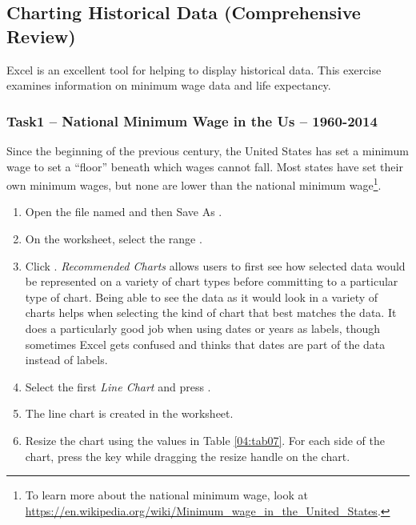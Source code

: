 \subsection{Charting Historical Data (Comprehensive Review)}

Excel is an excellent tool for helping to display historical data. This exercise examines information on minimum wage data and life expectancy.

\subsubsection{Task1 – National Minimum Wage in the Us – 1960-2014}

Since the beginning of the previous century, the United States has set a minimum wage to set a ``floor'' beneath which wages cannot fall. Most states have set their own minimum wages, but none are lower than the national minimum wage\footnote{To learn more about the national minimum wage, look at \url{https://en.wikipedia.org/wiki/Minimum_wage_in_the_United_States}.}.

\begin{enumerate}
	\item Open the file named  and then Save As .
	\item On the  worksheet, select the range .
	\item Click . \textit{Recommended Charts} allows users to first see how selected data would be represented on a variety of chart types before committing to a particular type of chart. Being able to see the data as it would look in a variety of charts helps when selecting the kind of chart that best matches the data. It does a particularly good job when using dates or years as labels, though sometimes Excel gets confused and thinks that dates are part of the data instead of labels.
	\item Select the first \textit{Line Chart} and press .
	\item The line chart is created in the  worksheet.
	\item Resize the chart using the values in Table \ref{04:tab07}. For each side of the chart, press the  key while dragging the resize handle on the chart.
\end{enumerate}	

